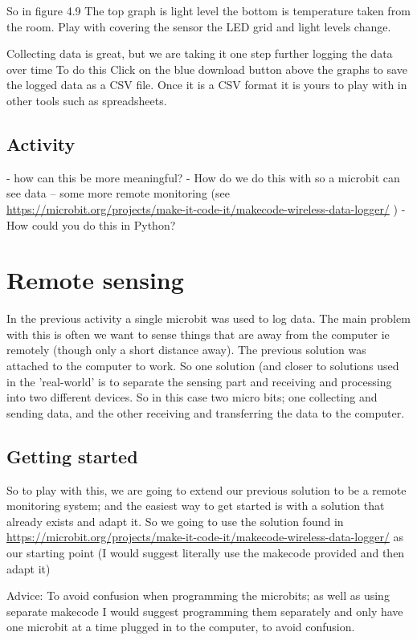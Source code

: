 So in figure 4.9 The top graph is light level the bottom is temperature taken from the room. Play with covering the sensor the LED grid and light levels change.

Collecting data is great, but we are taking it one step further logging the data over time To do this Click on the blue download button above the graphs to save the logged data as a CSV file. Once it is a CSV format it is yours to play with in other tools such as spreadsheets.


\subsection{Activity} 
-	how can this be more meaningful?
-	How do we do this with so a microbit can see data – some more remote monitoring (see \url{https://microbit.org/projects/make-it-code-it/makecode-wireless-data-logger/} )
-	How could you do this in Python?

\section{Remote sensing}

In the previous activity a single microbit was used to log data. The main problem with this is often we want to sense things that are away from the computer ie remotely (though only a short distance away). The previous solution was attached to the computer to work. So one solution (and closer to solutions used in the 'real-world' is to separate the sensing part and receiving and processing into two different devices. So in this case two micro bits; one collecting and sending data, and the other receiving and transferring the data to the computer.

\subsection{Getting started}

So to play with this, we are going to extend our previous solution to be a remote monitoring system; and the easiest way to get started is with a solution that already exists and adapt it. So we going to use the solution found in \url{https://microbit.org/projects/make-it-code-it/makecode-wireless-data-logger/} as our starting point (I would suggest literally use the makecode provided and then adapt it)

 

Advice: To avoid confusion when programming the microbits; as well as using separate makecode I would suggest programming them separately and only have one microbit at a time plugged in to the computer, to avoid confusion.

